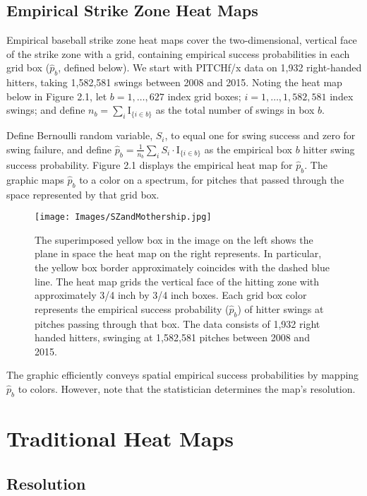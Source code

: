 \subsection{Empirical Strike Zone Heat Maps}

Empirical baseball strike zone heat maps cover the two-dimensional, vertical face of the strike zone with a grid, containing empirical success probabilities  in each grid box ($\hat{p}_{b}$, defined below).  We start with PITCHf/x\textsuperscript{\textregistered} data on 1,932 right-handed hitters, taking 1,582,581 swings between 2008 and 2015.  Noting the heat map below in Figure 2.1, let $b = 1, \dots, 627$ index grid boxes; $i = 1, \dots, 1,582,581$ index swings; and define $n_{b} = \displaystyle\sum_{i} \text{I}_{\{i \in b \}}$ as the total number of swings in box $b$.

Define Bernoulli random variable, $S_{i}$, to equal one for swing success and zero for swing failure, and define $\hat{p}_{b} = \frac{1}{n_{b}} \displaystyle\sum_{i} S_{i} \cdot \text{I}_{\{i \in b \}}$ as the empirical box $b$ hitter swing success probability. Figure 2.1 displays the empirical heat map for $\hat{p}_{b}$. The graphic maps $\hat{p}_{b}$ to a color on a spectrum, for pitches that passed through the space represented by that grid box.
  \begin{figure}[H]
	\centering
	\texttt{[image: Images/SZandMothership.jpg]} 
  \caption{The superimposed yellow box in the image on the left shows the plane in space the heat map on the right represents. In particular, the yellow box border approximately coincides with the dashed blue line. The heat map grids the vertical face of the hitting zone with approximately 3/4 inch by 3/4 inch boxes.  Each grid box color represents the empirical success probability ($\hat{p}_{b}$) of hitter swings at pitches passing through that box.  The data consists of 1,932 right handed hitters, swinging at 1,582,581 pitches between 2008 and 2015.}
	\end{figure} 
The graphic efficiently conveys spatial empirical success probabilities by mapping $\hat{p}_{b}$ to colors. However, note that the statistician determines the map's resolution.

\section{Traditional Heat Maps}

\subsection{Resolution} %

